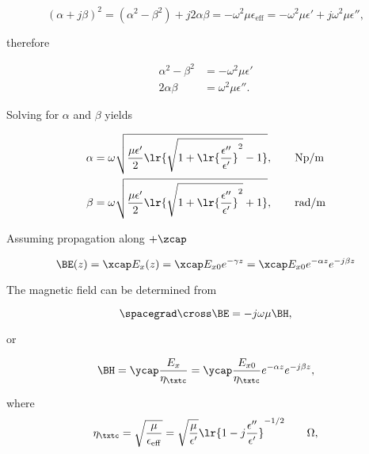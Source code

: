 \begin{dmath}\label{eqn:uwavesLecture3:120}
(\alpha + j \beta)^2 
= (\alpha^2 - \beta^2) + j 2 \alpha \beta 
= - \omega^2 \mu \epsilon_{\mathrm{eff}}
= - \omega^2 \mu \epsilon'
  + j \omega^2 \mu \epsilon'',
\end{dmath}

therefore

\begin{equation}\label{eqn:uwavesLecture3:140}
\begin{aligned}
\alpha^2 - \beta^2 &= - \omega^2 \mu \epsilon' \\
2 \alpha \beta &= \omega^2 \mu \epsilon''.
\end{aligned}
\end{equation}

Solving for \( \alpha \) and \( \beta \) yields

\begin{equation}\label{eqn:uwavesLecture3:160}
\begin{aligned}
\alpha &= \omega \sqrt{ \frac{\mu \epsilon'}{2} \lr{ \sqrt{ 1 + \lr{\frac{\epsilon''}{\epsilon'}}^2 } - 1 } }, \qquad \si{Np/m}  \\
\beta &= \omega \sqrt{ \frac{\mu \epsilon'}{2} \lr{ \sqrt{ 1 + \lr{\frac{\epsilon''}{\epsilon'}}^2 } + 1 } } , \qquad \si{rad/m} \\
\end{aligned}
\end{equation}

Assuming propagation along \( + \zcap \) 

\begin{dmath}\label{eqn:uwavesLecture3:180}
\BE(z) 
= \xcap E_x(z) 
= \xcap E_{x0} e^{-\gamma z} 
= \xcap E_{x0} e^{-\alpha z} e^{-j \beta z}
\end{dmath}

The magnetic field can be determined from 

\begin{dmath}\label{eqn:uwavesLecture3:200}
\spacegrad \cross \BE = - j \omega \mu \BH,
\end{dmath}

or

\begin{dmath}\label{eqn:uwavesLecture3:220}
\BH 
= \ycap \frac{E_x}{\eta_\txtc} 
= \ycap \frac{E_{x0}}{\eta_\txtc} e^{-\alpha z} e^{-j \beta z},
\end{dmath}

where
\begin{dmath}\label{eqn:uwavesLecture3:240}
\eta_\txtc 
= \sqrt{\frac{\mu}{\epsilon_{\mathrm{eff}}}} 
= \sqrt{\frac{\mu}{\epsilon'}} \lr{ 1 - j \frac{\epsilon''}{\epsilon'} }^{-1/2} \qquad \Omega,
\end{dmath}

